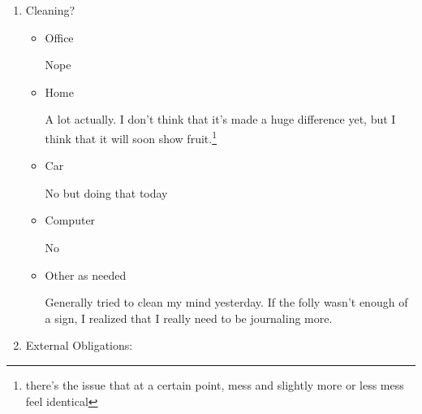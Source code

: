\documentclass[12pt]{article}
\renewcommand{\,}{\textsuperscript{,}}
\begin{document}
\begin{enumerate}
\begin{itemize}

\item Typing Practice?

Forgot yesterday, and today I'm planning to use it as a semi break if I don't feel like working through the list.

\item Applying to jobs?

Forgot to apply yesterday, have it on the list for today.

\item Reading the things I think could be good?

Eh, I gave up on one book because I realized that I didn't care about the remainder of its content, and wow that was such a freeing realization.\footnote{thanks dissertation camp}

\item Making manim videos?

No, but also on the list\footnote{if very low down}

\end{itemize}

\item Cleaning?

\begin{itemize}

\item Office

Nope

\item Home

A lot actually. I don't think that it's made a huge difference yet, but I think that it will soon show fruit.\footnote{there's the issue that at a certain point, mess and slightly more or less mess feel identical}

\item Car

No but doing that today

\item Computer

No

\item Other as needed

Generally tried to clean my mind yesterday. If the folly wasn't enough of a sign, I realized that I really need to be journaling more.

\end{itemize}

\item External Obligations:


\end{enumerate}
\end{document}

